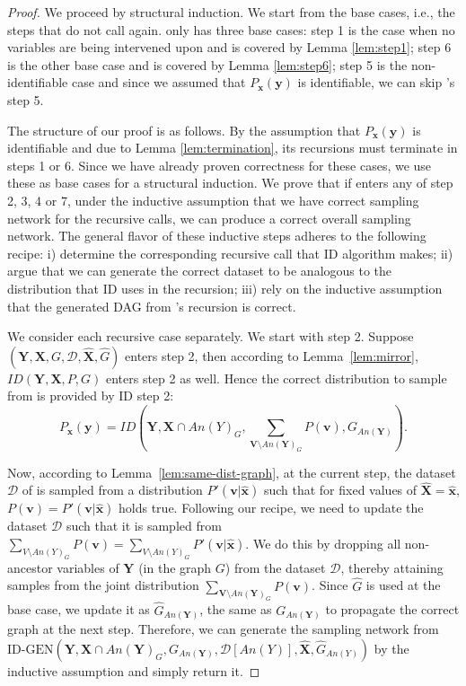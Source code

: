 \documentclass{article}
\newcommand{\x}{\mathbf{x}}
\newcommand{\y}{\mathbf{y}}
\newcommand{\X}{\mathbf{X}}
\newcommand{\Xp}{{\hat{\mathbf{X}}}}
\newcommand{\xp}{{\hat{\mathbf{x}}}}
\newcommand{\Gp}{{\hat{{G}}}}
\newcommand{\Y}{\mathbf{Y}}
\newcommand{\V}{\mathbf{V}}
\newcommand{\vb}{\mathbf{v}}
\newcommand{\data}{\mathcal{D}}
\newcommand{\idgen}{\text{ID-GEN}\xspace}
\newcommand{\idgenpar}{\idgen$(\mathbf{Y}, \mathbf{X},  G,  \data, {\Xp}, \Gp)$\xspace}
\theoremstyle{plain}
\theoremstyle{definition}
\theoremstyle{remark}
\begin{document}
	
	\begin{proof}
		We proceed by structural induction. We start from the base cases, i.e., the steps that do not call \idgen again. \idgen only has three base cases: step 1 is the case when no variables are being intervened upon and is covered by Lemma \ref{lem:step1}; step 6 is the other base case and is covered by Lemma \ref{lem:step6}; step 5 is the non-identifiable case and since we assumed that $P_{\x}(\y)$ is identifiable, 
  we can skip \idgen's step 5.
  
  The structure of our proof is as follows. By %
		the assumption that $P_{\x}(\y)$ is identifiable and due to Lemma \ref{lem:termination}, its recursions must terminate in steps 1 or 6. Since we have already proven correctness for these cases, we use these as base cases for a structural induction. We prove that if \idgen enters any of step 2, 3, 4 or 7, under the inductive assumption that we have correct sampling network for the recursive calls, we can produce a correct overall sampling network. The general flavor of these inductive steps adheres to the following recipe: i) determine the corresponding recursive call that ID algorithm makes; ii) argue that we can generate the correct dataset to be analogous to the distribution that ID uses in the recursion; iii) rely on the inductive assumption that the generated DAG from \idgen's recursion is correct.
		
		
		
		We consider each recursive case separately. We start with step 2. Suppose \idgenpar enters step 2, then 
		according to Lemma~\ref{lem:mirror}, $ID(\Y,\X, P, G)$ enters step 2 as well.
		Hence the correct distribution to sample from is provided by ID step 2: 
		\[P_{\x}(\y)= ID(\Y,\X\cap An(Y)_G, \sum_{\V\setminus An(\Y)_G} P(\vb), G_{An(\Y)}).\]



Now, according to Lemma~\ref{lem:same-dist-graph}, at the current step, the dataset $\data$ of \idgen is sampled from a distribution $P'(\vb|\xp)$ such that 
for fixed values of $\Xp=\xp$, $P(\vb) = P'(\vb|\xp)$ holds true.
  Following our recipe, we need to update the dataset $\data$ such that it is sampled from $\sum_{V\setminus An(Y)_G} P(\vb)
  =\sum_{V\setminus An(Y)_G} P'(\vb|\xp)
  $.
		We do this by dropping all non-ancestor variables  of $\Y$ (in the graph $G$) from the dataset $\data$, thereby attaining samples from the joint distribution $\sum_{\V\setminus An(\Y)_G} P(\vb)$. 
		Since $\Gp$ is used at the base case, we update it as $\Gp_{An(\Y)}$, the same as $G_{An(\Y)}$ to propagate the correct graph at the next step. Therefore, we can generate the sampling network from $\idgen(\Y, \X\cap An(\Y)_G, G_{An(\Y)}, \data[An(Y)],  \Xp, 
		\Gp_{An(Y)})$ by the inductive assumption and simply return it.
		

\end{proof}
\end{document}
